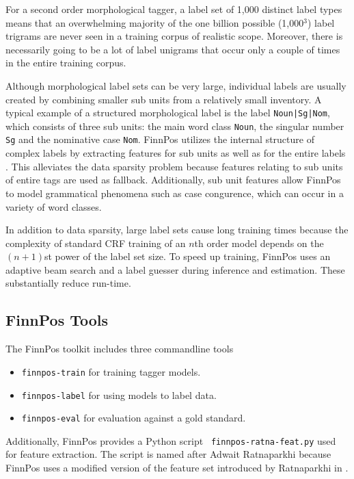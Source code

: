 \documentclass{llncs}
\begin{document}
For a second order morphological tagger, a label set of 1,000 distinct
label types means that an overwhelming majority of the one billion
possible (1,000$^3$) label trigrams are never seen in a training
corpus of realistic scope. Moreover, there is necessarily going to be
a lot of label unigrams that occur only a couple of times in the entire
training corpus.

Although morphological label sets can be very large, individual labels
are usually created by combining smaller sub units from a relatively
small inventory. A typical example of a structured morphological label
is the label {\tt Noun|Sg|Nom}, which consists of three sub units: the
main word class {\tt Noun}, the singular number {\tt Sg} and the
nominative case {\tt Nom}. FinnPos utilizes the internal structure of
complex labels by extracting features for sub units  as
well as for the entire labels \cite{silfverberg/2014}. This alleviates
the data sparsity problem because features relating to sub units of
entire tags are used as fallback. Additionally, sub unit features
allow FinnPos to model grammatical phenomena such as case congurence, which can occur in a variety of word classes.

In addition to data sparsity, large label sets cause long training
times because the complexity of standard CRF training of an $n$th
order model depends on the $(n+1)$st power of the label set size. To
speed up training, FinnPos uses an adaptive beam search and a label
guesser \cite{silfverberg/2015} during inference and estimation. These
substantially reduce run-time.

\subsection{FinnPos Tools}

The FinnPos toolkit includes three commandline tools

\begin{itemize}
\item {\tt finnpos-train} for training tagger models.
\item {\tt finnpos-label} for using models to label data.
\item {\tt finnpos-eval} for evaluation against a gold standard.
\end{itemize}

Additionally, FinnPos provides a Python script {\tt
  finnpos-ratna-feat.py} used for feature extraction. The script is
named after Adwait Ratnaparkhi because FinnPos uses a modified version
of the feature set introduced by Ratnaparkhi in
\cite{ratnaparkhi/1996}.
\end{document}
